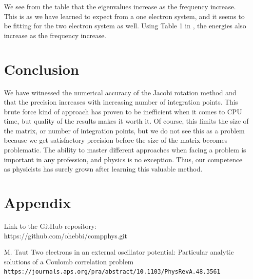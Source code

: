 \documentclass{article}
\begin{document}
We see from the table that the eigenvalues increase as the frequency increase. This is as we have learned to expect from a one electron system, and it seems to be fitting for the two electron system as well. Using Table 1 in \cite{M.Tant}, the energies also increase as the frequency increase.

\section{Conclusion}

We have witnessed the numerical accuracy of the Jacobi rotation method and that the precision increases with increasing number of integration points. This brute force kind of approach has proven to be inefficient when it comes to CPU time, but quality of the results makes it worth it. Of course, this limits the size of the matrix, or number of integration points, but we do not see this as a problem because we get satisfactory precision before the size of the matrix becomes problematic. The ability to master different approaches when facing a problem is important in any profession, and physics is no exception. Thus, our competence as physicists has surely grown after learning this valuable method.

\section{Appendix}
Link to the GitHub repository:\\

https://github.com/ohebbi/compphys.git

\begin{thebibliography}{}
M. Taut Two electrons in an external oscillator potential: Particular analytic solutions of a Coulomb correlation problem
\\\texttt{https://journals.aps.org/pra/abstract/10.1103/PhysRevA.48.3561}

\end{thebibliography}
\end{document}
